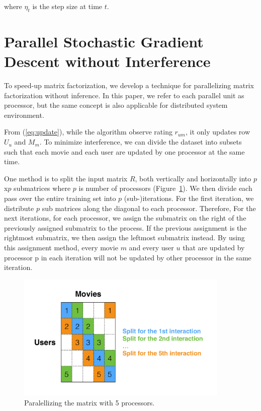 \documentclass{article} %
\newcommand{\U}{U}
\begin{document}
where $\eta_t$ is the step size at time $t$.

\section{Parallel Stochastic Gradient Descent without Interference}

To speed-up matrix factorization, we develop a technique for parallelizing matrix factorization without inference.
In this paper, we refer to each parallel unit as processor, but the same concept is also applicable for distributed system environment.

From (\ref{eq:update}), while the algorithm observe rating $r_{um}$,
it only updates row $\U_u$ and $M_m$.
To minimize interference, we can divide the dataset into subsets such that each movie and each user are updated by one processor at the same time.

One method is to split the input matrix $R$, both vertically and horizontally
into $p$x$p$ submatrices where $p$ is number of processors
(Figure~\ref{fig:split}). We then divide each pass over the entire training
set into $p$ (sub-)iterations. For the first iteration, we distribute $p$ sub
matrices along the diagonal to each processor.  Therefore,   For the next
iterations, for each processor, we assign the submatrix on the right of the
previously assigned submatrix to the process.  If the previous assignment is
the rightmost submatrix, we then assign the leftmost submatrix instead. By
using this assignment method, every movie $m$ and every user $u$ that are
updated by processor p in each iteration will not be updated by other
processor in the same iteration.

\begin{figure}[h]
\centering
\includegraphics[width=4in]{figures/split.pdf}
\caption{\label{fig:split} Paralellizing the matrix with 5 processors.}
\end{figure}
\end{document}
